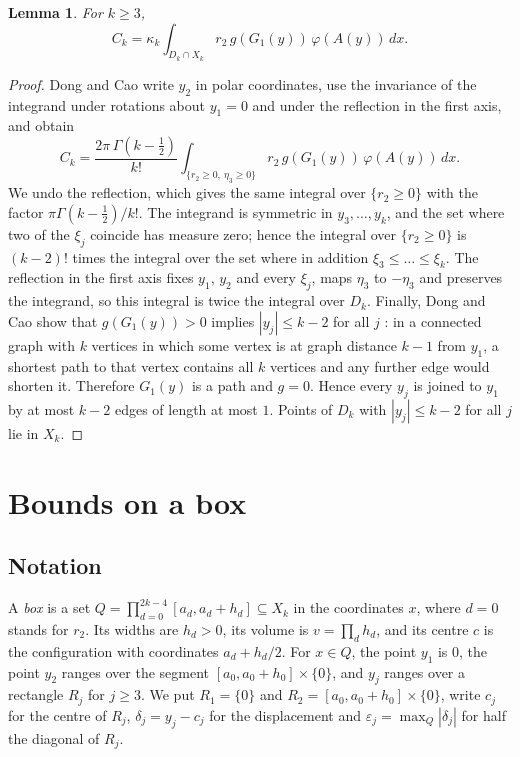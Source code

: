 \documentclass[11pt]{amsart}
\newtheorem{lemma}[theorem]{Lemma}
\theoremstyle{definition}
\theoremstyle{remark}
\numberwithin{equation}{section}
\begin{document}
\begin{lemma}\label{lem:domain}
For $k\ge3$,
\[
C_k=\kappa_k\int_{D_k\cap X_k}r_2\,g(G_1(y))\,\varphi(A(y))\,dx.
\]
\end{lemma}

\begin{proof}
Dong and Cao \cite[Section~3.3]{DC26} write $y_2$ in polar coordinates, use the invariance of the integrand under rotations about $y_1=0$ and under the reflection in the first axis, and obtain
\[
C_k=\frac{2\pi\,\Gamma(k-\frac12)}{k!}\int_{\{r_2\ge0,\ \eta_3\ge0\}}r_2\,g(G_1(y))\,\varphi(A(y))\,dx.
\]
We undo the reflection, which gives the same integral over $\{r_2\ge0\}$ with the factor $\pi\Gamma(k-\frac12)/k!$. The integrand is symmetric in $y_3,\dots,y_k$, and the set where two of the $\xi_j$ coincide has measure zero; hence the integral over $\{r_2\ge0\}$ is $(k-2)!$ times the integral over the set where in addition $\xi_3\le\dots\le\xi_k$. The reflection in the first axis fixes $y_1$, $y_2$ and every $\xi_j$, maps $\eta_3$ to $-\eta_3$ and preserves the integrand, so this integral is twice the integral over $D_k$. Finally, Dong and Cao show that $g(G_1(y))>0$ implies $|y_j|\le k-2$ for all $j$ \cite[Section~3.3]{DC26}: in a connected graph with $k$ vertices in which some vertex is at graph distance $k-1$ from $y_1$, a shortest path to that vertex contains all $k$ vertices and any further edge would shorten it. Therefore $G_1(y)$ is a path and $g=0$. Hence every $y_j$ is joined to $y_1$ by at most $k-2$ edges of length at most $1$. Points of $D_k$ with $|y_j|\le k-2$ for all $j$ lie in $X_k$.
\end{proof}

\section{Bounds on a box}\label{sec:box}

\subsection{Notation}
A \emph{box} is a set $Q=\prod_{d=0}^{2k-4}[a_d,a_d+h_d]\subseteq X_k$ in the coordinates $x$, where $d=0$ stands for $r_2$. Its widths are $h_d>0$, its volume is $v=\prod_dh_d$, and its centre $c$ is the configuration with coordinates $a_d+h_d/2$. For $x\in Q$, the point $y_1$ is $0$, the point $y_2$ ranges over the segment $[a_0,a_0+h_0]\times\{0\}$, and $y_j$ ranges over a rectangle $R_j$ for $j\ge3$. We put $R_1=\{0\}$ and $R_2=[a_0,a_0+h_0]\times\{0\}$, write $c_j$ for the centre of $R_j$, $\delta_j=y_j-c_j$ for the displacement and $\varepsilon_j=\max_Q|\delta_j|$ for half the diagonal of $R_j$.
\end{document}
